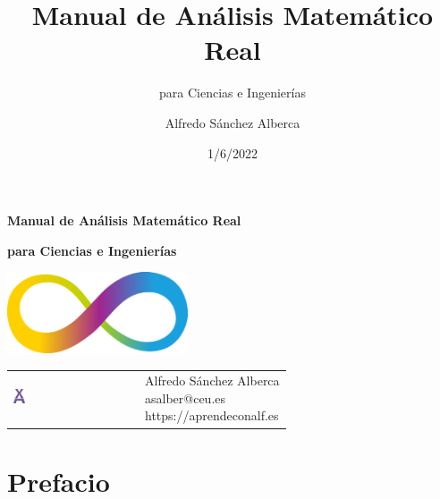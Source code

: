 \documentclass[
  a4paper,
]{scrreport}
\title{Manual de Análisis Matemático Real}
\subtitle{para Ciencias e Ingenierías}
\author{Alfredo Sánchez Alberca}
\date{1/6/2022}
\renewcommand*\contentsname{Indice de contenidos}
\newcommand\contentsname{Indice de contenidos}
\theoremstyle{definition}
\theoremstyle{plain}
\theoremstyle{definition}
\theoremstyle{plain}
\theoremstyle{plain}
\theoremstyle{remark}
\begin{document}
\begin{titlepage}

\begin{center}
\vspace*{5cm}

\Huge
{\textbf{\textsf{Manual de Análisis Matemático Real}}}

\vspace{0.5cm}
\LARGE
{\textbf{\textsf{para Ciencias e Ingenierías}}}

\vspace{1.5cm}

\includegraphics[width=0.4\textwidth]{img/logos/infinito.png}
\end{center}

\vfill

\begin{flushleft}
\begin{tabular}{ll}
\includegraphics[width=0.1\textwidth]{img/logos/aprendeconalf.png} & \parbox[b]{5cm}{\Large\textsf{Alfredo
Sánchez
Alberca}\\ \textsf{asalber@ceu.es} \\ \textsf{https://aprendeconalf.es}}
\end{tabular}
\end{flushleft}
\end{titlepage}\ifdefined\Shaded\renewenvironment{Shaded}{\begin{tcolorbox}[enhanced, sharp corners, boxrule=0pt, interior hidden, borderline west={3pt}{0pt}{shadecolor}, breakable, frame hidden]}{\end{tcolorbox}}\fi

\renewcommand*\contentsname{Indice de contenidos}
{
\hypersetup{linkcolor=}
\setcounter{tocdepth}{2}
\tableofcontents
}

\hypertarget{prefacio}{%
\chapter*{Prefacio}\label{prefacio}}
\end{document}
